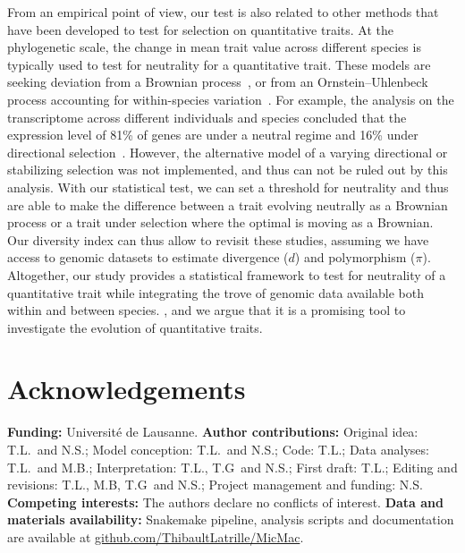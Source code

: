 \documentclass{article}
\begin{document}
From an empirical point of view, our test is also related to other methods that have been developed to test for selection on quantitative traits.
At the phylogenetic scale, the change in mean trait value across different species is typically used to test for neutrality for a quantitative trait.
These models are seeking deviation from a Brownian process~\cite{catalan_drift_2019}, or from an Ornstein–Uhlenbeck process accounting for within-species variation~\cite{rohlfs_phylogenetic_2015}.
For example, the analysis on the transcriptome across different individuals and species concluded that the expression level of 81\% of genes are under a neutral regime and 16\% under directional selection~\cite{catalan_drift_2019}.
However, the alternative model of a varying directional or stabilizing selection was not implemented, and thus can not be ruled out by this analysis.
With our statistical test, we can set a threshold for neutrality and thus are able to make the difference between a trait evolving neutrally as a Brownian process or a trait under selection where the optimal is moving as a Brownian.
Our diversity index can thus allow to revisit these studies, assuming we have access to genomic datasets to estimate divergence ($d$) and polymorphism ($\pi$).
Altogether, our study provides a statistical framework to test for neutrality of a quantitative trait while integrating the trove of genomic data available both within and between species.
, and we argue that it is a promising tool to investigate the evolution of quantitative traits.

\section*{Acknowledgements}
\label{sec:acknowledgment}
\textbf{Funding:}
Université de Lausanne.
\textbf{Author contributions:}
Original idea: T.L.\ and N.S.;
Model conception: T.L.\ and N.S.;
Code: T.L.;
Data analyses: T.L.\ and M.B.;
Interpretation: T.L., T.G\ and N.S.;
First draft: T.L.;
Editing and revisions: T.L., M.B, T.G\ and N.S.;
Project management and funding: N.S\@.
\textbf{Competing interests:}
The authors declare no conflicts of interest.
\textbf{Data and materials availability:}
Snakemake pipeline, analysis scripts and documentation are available at \href{https://github.com/ThibaultLatrille/MicMac}{github.com/ThibaultLatrille/MicMac}.

\printbibliography

\newpage
\end{document}

